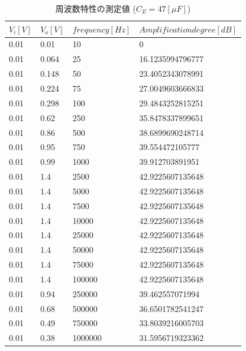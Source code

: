 \documentclass[10pt, a4j, dvipdfmx]{jarticle}
\begin{document}
    \begin{table}[H]
        \centering
        \caption{周波数特性の測定値 ($C_E = 47[\mu F]$)}
        \label{tbl:14}
        \small
        \begin{tabular}{|l|l|l|l|}
        \hline
        $V_i[V]$ & $V_o[V]$ & $frequency[Hz]$ & $Amplification degree[dB]$ \\ \hline
        0.01     & 0.01     & 10              & 0                          \\ \hline
        0.01     & 0.064    & 25              & 16.1235994796777           \\ \hline
        0.01     & 0.148    & 50              & 23.4052343078991           \\ \hline
        0.01     & 0.224    & 75              & 27.0049603666833           \\ \hline
        0.01     & 0.298    & 100             & 29.4843252815251           \\ \hline
        0.01     & 0.62     & 250             & 35.8478337899651           \\ \hline
        0.01     & 0.86     & 500             & 38.6899690248714           \\ \hline
        0.01     & 0.95     & 750             & 39.554472105777            \\ \hline
        0.01     & 0.99     & 1000            & 39.912703891951            \\ \hline
        0.01     & 1.4      & 2500            & 42.9225607135648           \\ \hline
        0.01     & 1.4      & 5000            & 42.9225607135648           \\ \hline
        0.01     & 1.4      & 7500            & 42.9225607135648           \\ \hline
        0.01     & 1.4      & 10000           & 42.9225607135648           \\ \hline
        0.01     & 1.4      & 25000           & 42.9225607135648           \\ \hline
        0.01     & 1.4      & 50000           & 42.9225607135648           \\ \hline
        0.01     & 1.4      & 75000           & 42.9225607135648           \\ \hline
        0.01     & 1.4      & 100000          & 42.9225607135648           \\ \hline
        0.01     & 0.94     & 250000          & 39.462557071994            \\ \hline
        0.01     & 0.68     & 500000          & 36.6501782541247           \\ \hline
        0.01     & 0.49     & 750000          & 33.8039216005703           \\ \hline
        0.01     & 0.38     & 1000000         & 31.5956719323362           \\ \hline
        \end{tabular}
        \normalsize
    \end{table}
\end{document}
